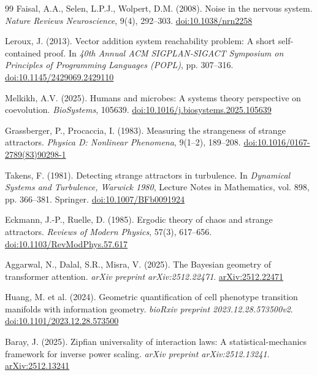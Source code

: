 \documentclass[12pt]{article}
\begin{document}
\begin{thebibliography}{99}
Faisal, A.A., Selen, L.P.J., Wolpert, D.M. (2008). Noise in the nervous system. \textit{Nature Reviews Neuroscience}, 9(4), 292--303. \href{https://doi.org/10.1038/nrn2258}{doi:10.1038/nrn2258}

Leroux, J. (2013). Vector addition system reachability problem: A short self-contained proof. In \textit{40th Annual ACM SIGPLAN-SIGACT Symposium on Principles of Programming Languages (POPL)}, pp. 307--316. \href{https://doi.org/10.1145/2429069.2429110}{doi:10.1145/2429069.2429110}

Melkikh, A.V. (2025). Humans and microbes: A systems theory perspective on coevolution. \textit{BioSystems}, 105639. \href{https://doi.org/10.1016/j.biosystems.2025.105639}{doi:10.1016/j.biosystems.2025.105639}

Grassberger, P., Procaccia, I. (1983). Measuring the strangeness of strange attractors. \textit{Physica D: Nonlinear Phenomena}, 9(1--2), 189--208. \href{https://doi.org/10.1016/0167-2789(83)90298-1}{doi:10.1016/0167-2789(83)90298-1}

Takens, F. (1981). Detecting strange attractors in turbulence. In \textit{Dynamical Systems and Turbulence, Warwick 1980}, Lecture Notes in Mathematics, vol. 898, pp. 366--381. Springer. \href{https://doi.org/10.1007/BFb0091924}{doi:10.1007/BFb0091924}

Eckmann, J.-P., Ruelle, D. (1985). Ergodic theory of chaos and strange attractors. \textit{Reviews of Modern Physics}, 57(3), 617--656. \href{https://doi.org/10.1103/RevModPhys.57.617}{doi:10.1103/RevModPhys.57.617}

Aggarwal, N., Dalal, S.R., Misra, V. (2025). The Bayesian geometry of transformer attention. \textit{arXiv preprint arXiv:2512.22471}. \href{https://arxiv.org/abs/2512.22471}{arXiv:2512.22471}

Huang, M. et al. (2024). Geometric quantification of cell phenotype transition manifolds with information geometry. \textit{bioRxiv preprint 2023.12.28.573500v2}. \href{https://doi.org/10.1101/2023.12.28.573500}{doi:10.1101/2023.12.28.573500}

Baray, J. (2025). Zipfian universality of interaction laws: A statistical-mechanics framework for inverse power scaling. \textit{arXiv preprint arXiv:2512.13241}. \href{https://arxiv.org/abs/2512.13241}{arXiv:2512.13241}

\end{thebibliography}
\end{document}
